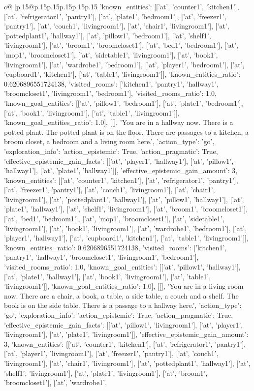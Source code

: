 \documentclass{article}
\begin{document}
{\begin{supertabular}{c@{$\;$}|p{.15\linewidth}@{}p{.15\linewidth}p{.15\linewidth}p{.15\linewidth}p{.15\linewidth}p{.15\linewidth}}
{{{'known_entities': [['at', 'counter1', 'kitchen1'], ['at', 'refrigerator1', 'pantry1'], ['at', 'plate1', 'bedroom1'], ['at', 'freezer1', 'pantry1'], ['at', 'couch1', 'livingroom1'], ['at', 'chair1', 'livingroom1'], ['at', 'pottedplant1', 'hallway1'], ['at', 'pillow1', 'bedroom1'], ['at', 'shelf1', 'livingroom1'], ['at', 'broom1', 'broomcloset1'], ['at', 'bed1', 'bedroom1'], ['at', 'mop1', 'broomcloset1'], ['at', 'sidetable1', 'livingroom1'], ['at', 'book1', 'livingroom1'], ['at', 'wardrobe1', 'bedroom1'], ['at', 'player1', 'bedroom1'], ['at', 'cupboard1', 'kitchen1'], ['at', 'table1', 'livingroom1']], 'known_entities_ratio': 0.6206896551724138, 'visited_rooms': ['kitchen1', 'pantry1', 'hallway1', 'broomcloset1', 'livingroom1', 'bedroom1'], 'visited_rooms_ratio': 1.0, 'known_goal_entities': [['at', 'pillow1', 'bedroom1'], ['at', 'plate1', 'bedroom1'], ['at', 'book1', 'livingroom1'], ['at', 'table1', 'livingroom1']], 'known_goal_entities_ratio': 1.0}}], [[], 'You are in a hallway now. There is a potted plant. The potted plant is on the floor. There are passages to a kitchen, a broom closet, a bedroom and a living room here.', {'action_type': 'go', 'exploration_info': {'action_epistemic': True, 'action_pragmatic': True, 'effective_epistemic_gain_facts': [['at', 'player1', 'hallway1'], ['at', 'pillow1', 'hallway1'], ['at', 'plate1', 'hallway1']], 'effective_epistemic_gain_amount': 3, 'known_entities': [['at', 'counter1', 'kitchen1'], ['at', 'refrigerator1', 'pantry1'], ['at', 'freezer1', 'pantry1'], ['at', 'couch1', 'livingroom1'], ['at', 'chair1', 'livingroom1'], ['at', 'pottedplant1', 'hallway1'], ['at', 'pillow1', 'hallway1'], ['at', 'plate1', 'hallway1'], ['at', 'shelf1', 'livingroom1'], ['at', 'broom1', 'broomcloset1'], ['at', 'bed1', 'bedroom1'], ['at', 'mop1', 'broomcloset1'], ['at', 'sidetable1', 'livingroom1'], ['at', 'book1', 'livingroom1'], ['at', 'wardrobe1', 'bedroom1'], ['at', 'player1', 'hallway1'], ['at', 'cupboard1', 'kitchen1'], ['at', 'table1', 'livingroom1']], 'known_entities_ratio': 0.6206896551724138, 'visited_rooms': ['kitchen1', 'pantry1', 'hallway1', 'broomcloset1', 'livingroom1', 'bedroom1'], 'visited_rooms_ratio': 1.0, 'known_goal_entities': [['at', 'pillow1', 'hallway1'], ['at', 'plate1', 'hallway1'], ['at', 'book1', 'livingroom1'], ['at', 'table1', 'livingroom1']], 'known_goal_entities_ratio': 1.0}}], [[], 'You are in a living room now. There are a chair, a book, a table, a side table, a couch and a shelf. The book is on the side table. There is a passage to a hallway here.', {'action_type': 'go', 'exploration_info': {'action_epistemic': True, 'action_pragmatic': True, 'effective_epistemic_gain_facts': [['at', 'pillow1', 'livingroom1'], ['at', 'player1', 'livingroom1'], ['at', 'plate1', 'livingroom1']], 'effective_epistemic_gain_amount': 3, 'known_entities': [['at', 'counter1', 'kitchen1'], ['at', 'refrigerator1', 'pantry1'], ['at', 'player1', 'livingroom1'], ['at', 'freezer1', 'pantry1'], ['at', 'couch1', 'livingroom1'], ['at', 'chair1', 'livingroom1'], ['at', 'pottedplant1', 'hallway1'], ['at', 'shelf1', 'livingroom1'], ['at', 'plate1', 'livingroom1'], ['at', 'broom1', 'broomcloset1'], ['at', 'wardrobe1', }}}
\end{supertabular}}
\end{document}
